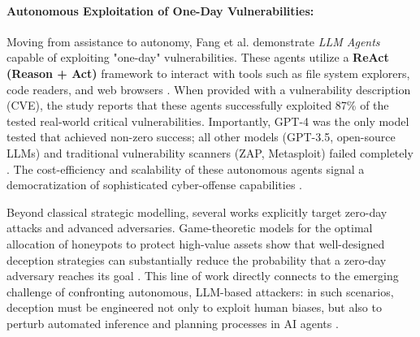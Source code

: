 \paragraph{Autonomous Exploitation of One-Day Vulnerabilities:}
Moving from assistance to autonomy, Fang et al. demonstrate \textit{LLM Agents} capable of exploiting "one-day"
vulnerabilities. These agents utilize a \textbf{ReAct (Reason + Act)} framework to interact with tools such as
file system explorers, code readers, and web browsers \cite{fang2024llm}.
When provided with a vulnerability description (CVE), the study reports that these agents successfully
exploited 87\% of the tested real-world critical vulnerabilities. Importantly, GPT-4 was the only model tested
that achieved non-zero success; all other models (GPT-3.5, open-source LLMs) and traditional vulnerability
scanners (ZAP, Metasploit) failed completely \cite{fang2024llm}. The cost-efficiency and scalability of
these autonomous agents signal a democratization of sophisticated cyber-offense capabilities \cite{fang2024llm}.

Beyond classical strategic modelling, several works explicitly target zero-day
attacks and advanced adversaries. Game-theoretic models for the optimal allocation
of honeypots to protect high-value assets show that well-designed deception
strategies can substantially reduce the probability that a zero-day adversary
reaches its goal \cite{zerodaydeception2023}. This line of work directly connects
to the emerging challenge of confronting autonomous, LLM-based attackers:
in such scenarios, deception must be engineered not only to exploit human
biases, but also to perturb automated inference and planning processes in AI
agents \cite{gameoftravesty2023,shieldapt2025}.